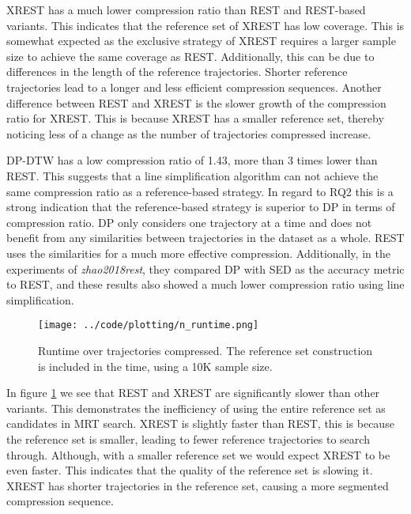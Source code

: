 XREST has a much lower compression ratio than REST and REST-based variants. This indicates that the reference set of XREST has low coverage. This is somewhat expected as the exclusive strategy of XREST requires a larger sample size to achieve the same coverage as REST. Additionally, this can be due to differences in the length of the reference trajectories. Shorter reference trajectories lead to a longer and less efficient compression sequences. Another difference between REST and XREST is the slower growth of the compression ratio for XREST. This is because XREST has a smaller reference set, thereby noticing less of a change as the number of trajectories compressed increase.

DP-DTW has a low compression ratio of 1.43, more than 3 times lower than REST. This suggests that a line simplification algorithm can not achieve the same compression ratio as a reference-based strategy. In regard to RQ2 this is a strong indication that the reference-based strategy is superior to DP in terms of compression ratio. DP only considers one trajectory at a time and does not benefit from any similarities between trajectories in the dataset as a whole. REST uses the similarities for a much more effective compression. Additionally, in the experiments of \textit{zhao2018rest}, they compared DP with SED as the accuracy metric to REST, and these results also showed a much lower compression ratio using line simplification.

\begin{figure}[h]
    \begin{minipage}{0.99\linewidth}
        \centering
        \texttt{[image: ../code/plotting/n\_runtime.png]}
        \caption{Runtime over trajectories compressed. The reference set construction is included in the time, using a 10K sample size.}
        \label{fig:n_runtime}
    \end{minipage}
\end{figure}

In figure \ref{fig:n_runtime} we see that REST and XREST are significantly slower than other variants. This demonstrates the inefficiency of using the entire reference set as candidates in MRT search. XREST is slightly faster than REST, this is because the reference set is smaller, leading to fewer reference trajectories to search through. Although, with a smaller reference set we would expect XREST to be even faster. This indicates that the quality of the reference set is slowing it. XREST has shorter trajectories in the reference set, causing a more segmented compression sequence.

